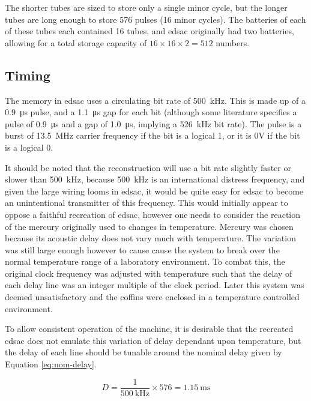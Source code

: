 The shorter tubes are sized to store only a single minor cycle, but the longer tubes are long enough to store 576 pulses (16 minor cycles). The batteries of each of these tubes each contained 16 tubes, and \gls{edsac} originally had two batteries, allowing for a total storage capacity of $16 \times 16 \times 2 = 512$ numbers.

\subsection{Timing} \label{sec:review-delay-timing}
The memory in \gls{edsac} uses a circulating bit rate of \SI{500}{\kilo\hertz}. This is made up of a \SI{0.9}{\micro\second} pulse, and a \SI{1.1}{\micro\second} gap for each bit (although some literature specifies a pulse of \SI{0.9}{\micro\second} and a gap of  \SI{1.0}{\micro\second}, implying a \SI{526}{\kilo\hertz} bit rate). The pulse is a burst of \SI{13.5}{\mega\hertz} carrier frequency if the bit is a logical 1, or it is 0V if the bit is a logical 0.

It should be noted that the reconstruction will use a bit rate slightly faster or slower than \SI{500}{\kilo\hertz}, because \SI{500}{\kilo\hertz} is an international distress frequency, and given the large wiring looms in \gls{edsac}, it would be quite easy for \gls{edsac} to become an unintentional transmitter of this frequency. This would initially appear to oppose a faithful recreation of \gls{edsac}, however one needs to consider the reaction of the mercury originally used to changes in temperature. Mercury was chosen because its acoustic delay does not vary much with temperature. The variation was still large enough however to cause cause the system to break over the normal temperature range of a laboratory environment. To combat this, the original clock frequency was adjusted with temperature such that the delay of each delay line was an integer multiple of the clock period. Later this system was deemed unsatisfactory and the coffins were enclosed in a temperature controlled environment.

To allow consistent operation of the machine, it is desirable that the recreated \gls{edsac} does not emulate this variation of delay dependant upon temperature, but the delay of each line should be tunable around the nominal delay given by Equation \ref{eq:nom-delay}.

\newcommand{\nominalLongTubeDelayMs}{1.15}

\begin{equation}
	D = \frac{1}{\SI{500}{\kilo\hertz}} \times 576 = \SI{\nominalLongTubeDelayMs}{\milli\second}  \label{eq:nom-delay}
\end{equation}


